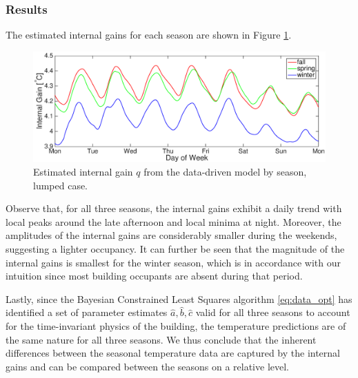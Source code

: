 \subsubsection{Results}
The estimated internal gains for each season are shown in Figure \ref{fig:qig_comparison_plot}.
\begin{figure}[hbtp]
\centering
\vspace*{-0.0cm}
\hspace*{-0.6cm}
\includegraphics[scale=0.35]{chapters/building_model/figures/data_lump_qig.eps}
\caption{Estimated internal gain $q$ from the data-driven model by season, lumped case.}
\vspace*{0.3cm}
\label{fig:qig_comparison_plot}
\end{figure}
Observe that, for all three seasons, the internal gains exhibit a daily trend with local peaks around the late afternoon and local minima at night. Moreover, the amplitudes of the internal gains are considerably smaller during the weekends, suggesting a lighter occupancy. It can further be seen that the magnitude of the internal gains is smallest for the winter season, which is in accordance with our intuition since most building occupants are absent during that period.


Lastly, since the Bayesian Constrained Least Squares algorithm \eqref{eq:data_opt} has identified a set of parameter estimates $\hat{a}, \hat{b}, \hat{c}$ valid for all three seasons to account for the time-invariant physics of the building, the temperature predictions are of the same nature for all three seasons. We thus conclude that the inherent differences between the seasonal temperature data are captured by the internal gains and can be compared between the seasons on a relative level.

